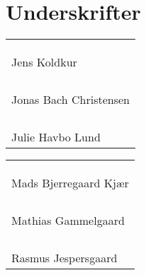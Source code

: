 \section*{Underskrifter}
\begin{center}
\begin{minipage}[b]{0.45\textwidth}
\begin{center}
\begin{tabular}{l}
\phantom{Julieervirkeligdejligogsødogsmuk} \\
\\
\\
\hline
Jens Koldkur \\
\\
\\
\\
\\
\hline
Jonas Bach Christensen \\
\\
\\
\\
\\
\hline
Julie Havbo Lund \\         
\end{tabular}
\end{center}
\end{minipage}
%
\begin{minipage}[b]{0.038\textwidth}
\phantom{xD}
\end{minipage}
\begin{minipage}[b]{0.45\textwidth}
\begin{center}
\begin{tabular}{l}
\phantom{Julieervirkeligdejligogsødogsmukogs} \\
\\
\\
\hline
Mads Bjerregaard Kjær \\
\\
\\
\\
\\
\hline
Mathias Gammelgaard \\
\\
\\
\\
\\
\hline
Rasmus Jespersgaard \\         
\end{tabular}
\end{center}
\end{minipage}
\end{center}